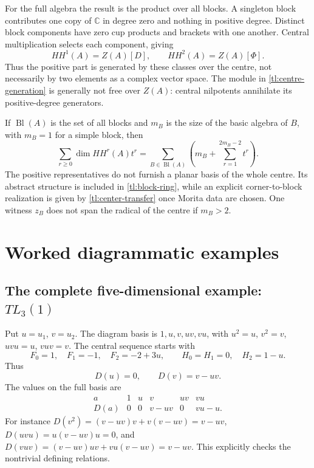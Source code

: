 \documentclass[a4paper,11pt,oneside,reqno]{amsart}
\theoremstyle{definition}
\numberwithin{equation}{section}
\begin{document}
	For the full algebra the result is the product over all blocks.
	A singleton block contributes one copy of $\mathbb C$ in degree zero
	and nothing in positive degree.  Distinct block components have zero
	cup products and brackets with one another.  Central multiplication
	selects each component, giving
	\begin{equation}\label{tl:centre-generation}
		HH^1(A)=Z(A)[D],\qquad HH^2(A)=Z(A)[\Phi].
	\end{equation}
	Thus the positive part is generated by these classes over the centre,
	not necessarily by two elements as a complex vector space.
	The module in \eqref{tl:centre-generation} is generally not free over
	$Z(A)$: central nilpotents annihilate its positive-degree generators.
	
	If $\operatorname{Bl}(A)$ is the set of all blocks and $m_B$ is the size of the
	basic algebra of $B$, with $m_B=1$ for a simple block, then
	\begin{equation}\label{tl:full-hilbert}
		\sum_{r\ge0}\dim HH^r(A)t^r
		=\sum_{B\in\operatorname{Bl}(A)}
		\left(m_B+\sum_{r=1}^{2m_B-2}t^r\right).
	\end{equation}
	The positive representatives do not furnish a planar basis of the
	whole centre.  Its abstract structure is included in
	\eqref{tl:block-ring}, while an explicit corner-to-block realization
	is given by \eqref{tl:center-transfer} once Morita data are chosen.
	One witness $z_B$ does not span the radical of the centre if $m_B>2$.
	
	
	\section{Worked diagrammatic examples}\label{tl:examples}
	\subsection{The complete five-dimensional example: \texorpdfstring{$TL_3(1)$}{TL3(1)}}
	Put $u=u_1$, $v=u_2$.  The diagram basis is
	$1,u,v,uv,vu$, with $u^2=u$, $v^2=v$, $uvu=u$, $vuv=v$.
	The central sequence starts with
	\[
	F_0=1,\quad F_1=-1,\quad F_2=-2+3u,
	\qquad H_0=H_1=0,\quad H_2=1-u.
	\]
	Thus
	\begin{equation}\label{tl:TL3D}
		D(u)=0,\qquad D(v)=v-uv.
	\end{equation}
	The values on the full basis are
	\[
	\begin{array}{c|ccccc}
		a&1&u&v&uv&vu\\\hline
		D(a)&0&0&v-uv&0&vu-u.
	\end{array}
	\]
	For instance $D(v^2)=(v-uv)v+v(v-uv)=v-uv$,
	$D(uvu)=u(v-uv)u=0$, and
	$D(vuv)=(v-uv)uv+vu(v-uv)=v-uv$.
	This explicitly checks the nontrivial defining relations.
	
\end{document}
